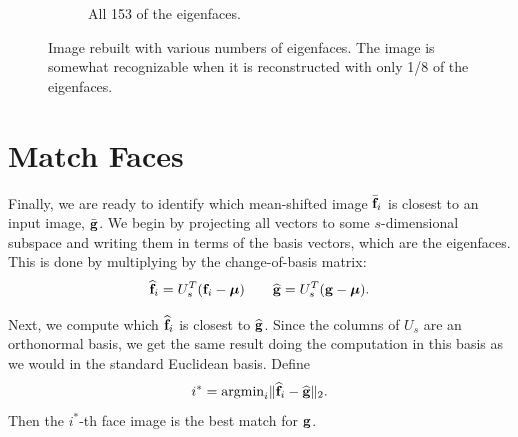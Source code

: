 \begin{figure}
\begin{subfigure}[b]{0.3\textwidth}
    \caption{All 153 of the eigenfaces.}
    \label{fig:all_efaces}
\end{subfigure}
\caption{Image rebuilt with various numbers of eigenfaces. The image is somewhat recognizable when it is reconstructed with only 1/8 of the eigenfaces.}
\label{fig:rebuiltImage}
\end{figure}

\section*{Match Faces} %

Finally, we are ready to identify which mean-shifted image $\bar{\mathbf{f}}_i$ is closest to an input image, $\bar{\mathbf{g}}$.
We begin by projecting all vectors to some $s$-dimensional subspace and writing them in terms of the basis vectors, which are the eigenfaces.
This is done by multiplying by the change-of-basis matrix:
\[
\widehat{\mathbf{f}}_i = U_s^T(\mathbf{f}_i-{\boldsymbol \mu}) \qquad \widehat{\mathbf{g}} = U_s^T(\mathbf{g}-{\boldsymbol \mu}).
\]

Next, we compute which $\widehat{\mathbf{f}}_i$ is closest to $\widehat{\mathbf{g}}$.
Since the columns of $U_s$ are an orthonormal basis, we get the same result doing the computation in this basis as we would in the standard Euclidean basis.
Define
\[
i^* = \text{argmin}_i \|\widehat{\mathbf{f}}_i - \widehat{\mathbf{g}}\|_2.
\]
Then the $i^*$-th face image is the best match for $\mathbf{g}$.

